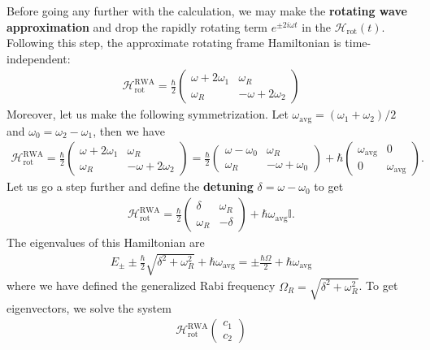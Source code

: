 \documentclass{article}
\theoremstyle{definition}
\newcommand{\ham}{\mathcal{H}}
\newcommand{\f}[2]{\frac{#1}{#2}}
\newcommand{\RWA}{\ham_\text{rot}^\text{RWA}}
\begin{document}
\begin{enumerate}[label=\alph*)]
	Before going any further with the calculation, we may make the \textbf{rotating wave approximation} and drop the rapidly rotating term $e^{\pm 2i\omega t}$ in the $\ham_\text{rot}(t)$. Following this step, the approximate rotating frame Hamiltonian is time-independent:
	\begin{align*}
	\RWA =  \f{\hbar}{2} \begin{pmatrix}
	\omega +  2\omega_1 & \omega_R \\ 
	\omega_R  & -\omega + 2\omega_2
	\end{pmatrix}
	\end{align*}
	Moreover, let us make the following symmetrization. Let $\omega_\text{avg} = (\omega_1 + \omega_2)/2$ and $\omega_0 = \omega_2 - \omega_1$, then we have
	\begin{align*}
	\RWA = \f{\hbar}{2} \begin{pmatrix}
	\omega +  2\omega_1 & \omega_R \\ 
	\omega_R  & -\omega + 2\omega_2
	\end{pmatrix}
	= 
	\f{\hbar}{2} \begin{pmatrix}
	\omega -  \omega_0 & \omega_R \\ 
	\omega_R  & -\omega +\omega_0 
	\end{pmatrix}
	+ \hbar \begin{pmatrix}
	\omega_\text{avg} & 0 \\ 0 & \omega_\text{avg}
	\end{pmatrix}.
	\end{align*}
	Let us go a step further and define the \textbf{detuning} $\delta = \omega - \omega_0$ to get
	\begin{align*}
	\RWA = \f{\hbar}{2}\begin{pmatrix}
	\delta & \omega_R \\  \omega_R & -\delta
	\end{pmatrix} + \hbar \omega_\text{avg} \mathbb{I}.
	\end{align*}
	The eigenvalues of this Hamiltonian are
	\begin{align*}
	E_\pm \pm \f{\hbar}{2}\sqrt{\delta^2 + \omega_R^2} + \hbar \omega_\text{avg} = \pm \f{\hbar \Omega}{2} + \hbar \omega_\text{avg}
	\end{align*}
	where we have defined the generalized Rabi frequency $\Omega_R = \sqrt{\delta^2 + \omega_R^2}$. To get eigenvectors, we solve the system 
	\begin{align*}
	\RWA \begin{pmatrix}
	c_1 \\ c_2

\end{pmatrix}
\end{align*}
\end{enumerate}
\end{document}
